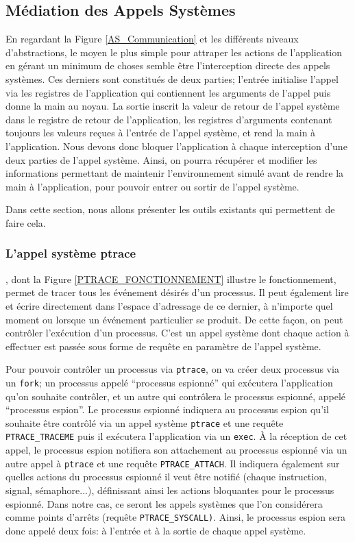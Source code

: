 \subsection{Médiation des Appels Systèmes}

En regardant la Figure \ref{AS_Communication} et les différents niveaux
d'abstractions, le moyen le plus simple pour attraper les actions de
l'application en gérant un minimum de choses semble être l'interception directe des appels systèmes. Ces derniers sont constitués de deux parties; l'entrée
initialise l'appel via les registres de l'application qui contiennent les
arguments de l'appel puis donne la main au noyau. La sortie inscrit la valeur de
retour de l'appel système dans le registre de retour de l'application, les
registres d'arguments contenant toujours les valeurs reçues à l'entrée de
l'appel système, et rend la main à l'application. Nous devons donc bloquer
l'application à chaque interception d'une deux parties de l'appel système. Ainsi, on pourra récupérer et modifier les informations permettant de maintenir
l'environnement simulé avant de rendre la main à l'application, pour pouvoir entrer ou
sortir de l'appel système.

 Dans cette section, nous allons présenter les outils existants qui permettent
 de faire cela.
 
 \subsubsection{L'appel système ptrace}\citep{AS:Interception, MARION:Interception}
 , dont la Figure \ref{PTRACE_FONCTIONNEMENT} illustre le fonctionnement, permet
 de tracer tous les événement désirés d'un processus. Il peut également lire et
 écrire directement dans l'espace d'adressage de ce dernier, à n'importe quel
 moment ou lorsque un événement particulier se produit. De cette façon, on peut
 contrôler l'exécution d'un processus. C'est un appel système dont chaque action
 à effectuer est passée sous forme de requête en paramètre de l'appel système.

Pour pouvoir contrôler un processus via \texttt{ptrace}, on va créer deux
processus via un \texttt{fork}; un processus appelé ``processus espionné'' qui
exécutera l'application qu'on souhaite contrôler, et un autre qui contrôlera le
processus espionné, appelé ``processus espion''. Le processus espionné indiquera
au processus espion qu'il souhaite être contrôlé via un appel
système \texttt{ptrace} et une requête \texttt{PTRACE\_TRACEME} puis il
exécutera l'application via un \texttt{exec}. À la réception de cet appel, le
processus espion notifiera son attachement au processus espionné via un autre
appel à \texttt{ptrace} et une requête \texttt{PTRACE\_ATTACH}. Il indiquera
également sur quelles actions du processus espionné il veut être notifié (chaque
instruction, signal, sémaphore...), définissant ainsi les actions bloquantes
pour le processus espionné. Dans notre cas, ce seront les appels systèmes que
l'on considérera comme points d'arrêts (requête
\texttt{PTRACE\_SYSCALL)}. Ainsi, le processus espion sera donc appelé deux
fois: à l'entrée et à la sortie de chaque appel système.

